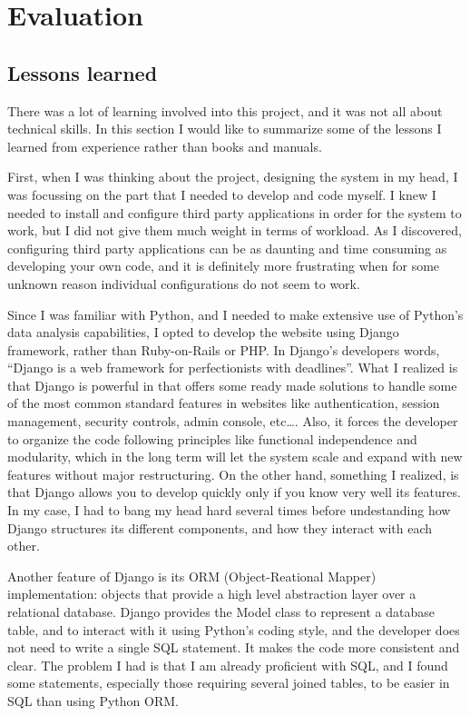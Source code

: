 \chapter{Evaluation}

\section{Lessons learned}
There was a lot of learning involved into this project, and it was not all about
technical skills. In this section I would like to summarize some of the lessons
I learned from experience rather than books and manuals.

First, when I was thinking about the project, designing the system in
my head, I was focussing on the part that I needed to develop and
code myself. I knew I needed to install and configure third party
applications in order for the system to work, but I did not give them
much weight in terms of workload. As I discovered, configuring third party
applications can be as daunting and time consuming as developing your own
code, and it is definitely more frustrating when for some unknown reason
individual configurations do not seem to work.

Since I was familiar with Python, and I needed to make extensive use of
Python's data analysis capabilities, I opted to develop the website using Django
framework, rather than Ruby-on-Rails or PHP. In Django's developers words,
``Django is a web framework for perfectionists with deadlines''.  What I
realized is that Django is powerful in that offers some ready made solutions
to handle some of the most common standard features in websites like
authentication, session management, security controls, admin console, etc\ldots.
Also, it forces the developer to organize the code following principles like
functional independence and modularity, which in the long term will let the
system scale and expand with new features without major restructuring. On the
other hand, something I realized, is that Django allows you to develop quickly
only if you know very well its features. In my case, I had to bang my head hard
several times before undestanding how Django structures its different
components, and how they interact with each other.

Another feature of Django is its ORM (Object-Reational Mapper) implementation:
objects that provide a high level abstraction layer over a relational database. Django
provides the Model class to represent a database table, and to interact with it
using Python's coding style, and the developer does not need to write a
single SQL statement. It makes the code more consistent and clear. The problem I
had is that I am already proficient with SQL, and I found some statements,
especially those requiring several joined tables, to be easier in SQL than using
Python ORM.

